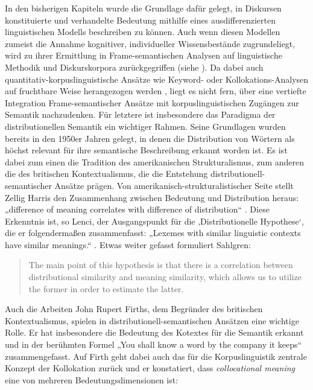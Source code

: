 In den bisherigen Kapiteln wurde die Grundlage dafür gelegt, in Diskursen konstituierte und verhandelte Bedeutung mithilfe eines ausdifferenzierten linguistischen Modells beschreiben zu können. Auch wenn diesen Modellen zumeist die Annahme kognitiver, individueller Wissensbestände zugrundeliegt, wird zu ihrer Ermittlung in Frame-semantischen Analysen auf linguistische Methodik und Diskurskorpora zurückgegriffen (siehe ). Da dabei auch quantitativ-korpuslinguistische Ansätze wie Keyword- oder Kollokations-Analysen auf fruchtbare Weise herangezogen werden \autocites[siehe u.\,a.][]{czuloEinflussExtremistischerGewaltereignisse2020, ziemMedienFramesAlsSemantische2018, ziem3WortschatzII2017, storjohannPrasenzUndAbsenz2013}, liegt es nicht fern, über eine vertiefte Integration Frame-semantischer Ansätze mit korpuslinguistischen Zugängen zur Semantik nachzudenken. Für letztere ist insbesondere das Paradigma der distributionellen Semantik ein wichtiger Rahmen. Seine Grundlagen wurden bereits in den 1950er Jahren gelegt, in denen die Distribution von Wörtern als höchst relevant für ihre semantische Beschreibung erkannt worden ist. Es ist dabei zum einen die Tradition des amerikanischen Strukturalismus, zum anderen die des britischen Kontextualismus, die die Entstehung distributionell-semantischer Ansätze prägen. Von amerikanisch-strukturalistischer Seite stellt Zellig Harris den Zusammenhang zwischen Bedeutung und Distribution heraus: „difference of meaning correlates with difference of distribution`` \autocite*[156]{harrisDistributionalStructure1954}. Diese Erkenntnis ist, so Lenci, der Ausgangspunkt für die ‚Distributionelle Hypothese`, die er folgendermaßen zusammenfasst: „Lexemes with similar linguistic contexts have similar meanings.`` \autocite[152]{lenciDistributionalModelsWord2018}. Etwas weiter gefasst formuliert Sahlgren:

\begin{quote}
The main point of this hypothesis is that there is a correlation between distributional similarity and meaning similarity, which allows us to utilize the former in order to estimate the latter. \autocite[33]{sahlgrenDistributionalHypothesis2008}
\end{quote}

Auch die Arbeiten John Rupert Firths, dem Begründer des britischen Kontextualismus, spielen in distributionell-semantischen Ansätzen eine wichtige Rolle. Er hat insbesondere die Bedeutung des Kotextes für die Semantik erkannt und in der berühmten Formel „You shall know a word by the company it keeps`` \autocite[11]{firthSynopsisLinguisticTheory1957} zusammengefasst. Auf Firth geht dabei auch das für die Korpuslinguistik zentrale Konzept der Kollokation zurück und er konstatiert, dass \emph{collocational meaning} eine von mehreren Bedeutungsdimensionen ist:

